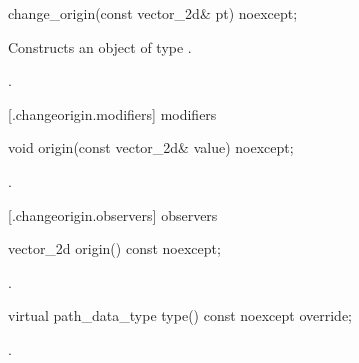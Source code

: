 \begin{itemdecl}
    change_origin(const vector_2d& pt) noexcept;
\end{itemdecl}
\begin{itemdescr}
	\pnum
	\effects
	Constructs an object of type .
	
	\pnum
	\postconditions
	.
\end{itemdescr}

 [\iotwod.changeorigin.modifiers]{ modifiers}

\begin{itemdecl}
    void origin(const vector_2d& value) noexcept;
\end{itemdecl}
\begin{itemdescr}
	\pnum
	\postconditions
	.
	
\end{itemdescr}

 [\iotwod.changeorigin.observers]{ observers}

\begin{itemdecl}
    vector_2d origin() const noexcept;
\end{itemdecl}
\begin{itemdescr}
	\pnum
	\returns
	.

\end{itemdescr}

\begin{itemdecl}
    virtual path_data_type type() const noexcept override;
\end{itemdecl}
\begin{itemdescr}
	\pnum
	\returns
	.

\end{itemdescr}
